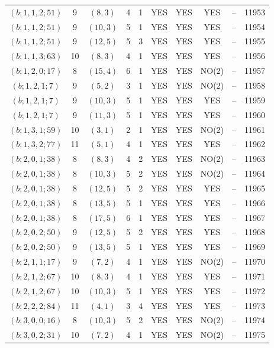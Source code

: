 \begin{longtable}{|c|c|c|c|c|c|c|c|c|c|}
$(b; 1, 1, 2; 51)$ & 9 & $(8, 3)$ & 4 & 1 & YES & YES & YES & -- & 11953\\
$(b; 1, 1, 2; 51)$ & 9 & $(10, 3)$ & 5 & 1 & YES & YES & YES & -- & 11954\\
$(b; 1, 1, 2; 51)$ & 9 & $(12, 5)$ & 5 & 3 & YES & YES & YES & -- & 11955\\
$(b; 1, 1, 3; 63)$ & 10 & $(8, 3)$ & 4 & 1 & YES & YES & YES & -- & 11956\\
$(b; 1, 2, 0; 17)$ & 8 & $(15, 4)$ & 6 & 1 & YES & YES & NO(2) & -- & 11957\\
$(b; 1, 2, 1; 7)$ & 9 & $(5, 2)$ & 3 & 1 & YES & YES & NO(2) & -- & 11958\\
$(b; 1, 2, 1; 7)$ & 9 & $(10, 3)$ & 5 & 1 & YES & YES & YES & -- & 11959\\
$(b; 1, 2, 1; 7)$ & 9 & $(11, 3)$ & 5 & 1 & YES & YES & YES & -- & 11960\\
$(b; 1, 3, 1; 59)$ & 10 & $(3, 1)$ & 2 & 1 & YES & YES & NO(2) & -- & 11961\\
$(b; 1, 3, 2; 77)$ & 11 & $(5, 1)$ & 4 & 1 & YES & YES & YES & -- & 11962\\
$(b; 2, 0, 1; 38)$ & 8 & $(8, 3)$ & 4 & 2 & YES & YES & NO(2) & -- & 11963\\
$(b; 2, 0, 1; 38)$ & 8 & $(10, 3)$ & 5 & 2 & YES & YES & NO(2) & -- & 11964\\
$(b; 2, 0, 1; 38)$ & 8 & $(12, 5)$ & 5 & 2 & YES & YES & YES & -- & 11965\\
$(b; 2, 0, 1; 38)$ & 8 & $(13, 5)$ & 5 & 1 & YES & YES & YES & -- & 11966\\
$(b; 2, 0, 1; 38)$ & 8 & $(17, 5)$ & 6 & 1 & YES & YES & YES & -- & 11967\\
$(b; 2, 0, 2; 50)$ & 9 & $(12, 5)$ & 5 & 2 & YES & YES & YES & -- & 11968\\
$(b; 2, 0, 2; 50)$ & 9 & $(13, 5)$ & 5 & 1 & YES & YES & YES & -- & 11969\\
$(b; 2, 1, 1; 17)$ & 9 & $(7, 2)$ & 4 & 1 & YES & YES & NO(2) & -- & 11970\\
$(b; 2, 1, 2; 67)$ & 10 & $(8, 3)$ & 4 & 1 & YES & YES & YES & -- & 11971\\
$(b; 2, 1, 2; 67)$ & 10 & $(10, 3)$ & 5 & 1 & YES & YES & YES & -- & 11972\\
$(b; 2, 2, 2; 84)$ & 11 & $(4, 1)$ & 3 & 4 & YES & YES & YES & -- & 11973\\
$(b; 3, 0, 0; 16)$ & 8 & $(10, 3)$ & 5 & 2 & YES & YES & NO(2) & -- & 11974\\
$(b; 3, 0, 2; 31)$ & 10 & $(7, 2)$ & 4 & 1 & YES & YES & NO(2) & -- & 11975\\

\end{longtable}
